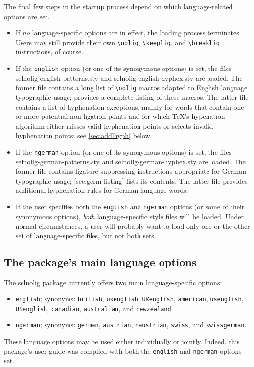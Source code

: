 \documentclass[11pt]{article}
\newcommand{\pkg}[1]{\textsf{#1}}
\newcommand{\opt}[1]{\texttt{#1}}
\newcommand{\cmmd}[1]{\texttt{\textbackslash #1}}
\begin{document}
The final few steps in the startup process depend on which language-related options are set.
\begin{itemize}
\item If \emph{no} language-specific options are in effect, the loading process terminates. Users may still provide their own \cmmd{nolig}, \cmmd{keeplig}, and \cmmd{breaklig} instructions, of course.

\item If the \opt{english} option (or one of its synonymous options) is set, the files \pkg{selnolig-english-patterns.sty} and \pkg{selnolig-english-hyphex.sty} are loaded. The former file contains a long list of \cmmd{nolig} macros adapted to English language typographic usage;  provides a complete listing of these macros. The latter file contains a list of hyphenation exceptions, mainly for words that contain one or more potential non-ligation points and for which \TeX's hypenation algorithm either misses valid hyphenation points or selects invalid hyphenation points; see \cref{sec:addlhyph} below.

\item If the \opt{ngerman} option (or one of its synonymous options) is set, the files \pkg{selnolig-german-patterns.sty} and \pkg{selnolig-german-hyphex.sty} are loaded. The former file contains ligature-suppressing instructions appropriate for German typographic usage; \cref{sec:germ-listing} lists its contents. The latter file provides additional hyphenation rules for German-language words.

\item If the user specifies both the \opt{english} and \opt{ngerman} options (or some of their synonymous options), \emph{both} language-specific style files will be loaded. Under normal circumstances, a user will probably want to load only one or the other set of language-specific files, but not both sets.
\end{itemize}


\subsection{The package's main language options}

The \pkg{selnolig} package currently offers two main language-specific options: 
\begin{itemize}
\item \opt{english}; synonyms: \opt{british}, \opt{ukenglish}, \opt{UKenglish}, \opt{amer\-ican}, \opt{usenglish}, \opt{USenglish}, \opt{cana\-dian}, \opt{australian}, and \opt{new\-zealand}.
\item \opt{ngerman}; synonyms: \opt{german}, \opt{austrian}, \opt{naustrian}, \opt{swiss}, and \opt{swiss\-german}.
\end{itemize}
These language options may be used either individually or jointly. Indeed, this package's user guide was compiled with both the \opt{english} and \opt{ngerman} options set.
\end{document}
